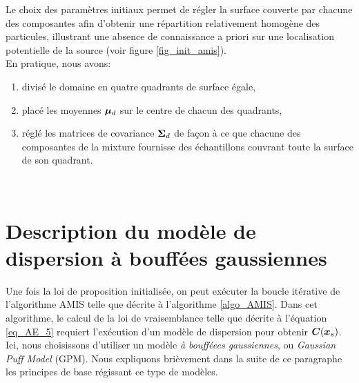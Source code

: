   Le choix des paramètres initiaux permet de régler la surface couverte par chacune des composantes afin d'obtenir une répartition relativement homogène des particules, illustrant une absence de connaissance a priori sur une localisation potentielle de la source (voir figure \ref{fig_init_amis}). \\
  
  En pratique, nous avons:
  
  \begin{enumerate}
  	\item divisé le domaine en quatre quadrants de surface égale, 
  	\item  placé les moyennes ${\bm{\mu}}_d$ sur le centre de chacun des quadrants,
  	\item réglé les matrices de covariance ${\bm{\Sigma}}_d$ de façon à ce que chacune des composantes de la mixture fournisse des échantillons couvrant toute la surface de son quadrant.\\
  \end{enumerate}
  
 \\


\section{Description du modèle de dispersion à bouffées gaussiennes}

Une fois la loi de proposition initialisée, on peut exécuter la boucle itérative de l'algorithme AMIS telle que décrite à l'algorithme \ref{algo_AMIS}. Dans cet algorithme, le calcul de la loi de vraisemblance telle que décrite à l'équation \eqref{eq_AE_5} requiert l'exécution d'un modèle de dispersion pour obtenir ${\bm{C}}({\bm{x}_s})$. Ici, nous choisissons d'utiliser un modèle \textit{à boufféees gaussiennes}, ou \textit{Gaussian Puff Model} (GPM). Nous expliquons brièvement dans la suite de ce paragraphe les principes de base régissant ce type de modèles.\\

